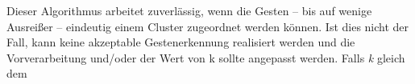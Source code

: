 Dieser Algorithmus arbeitet zuverlässig, wenn die Gesten -- bis auf wenige Ausreißer -- eindeutig einem Cluster zugeordnet werden können. Ist dies nicht der Fall, kann keine akzeptable Gestenerkennung realisiert werden und die Vorverarbeitung und/oder der Wert von k sollte angepasst werden.
 Falls \emph{k} gleich dem 









